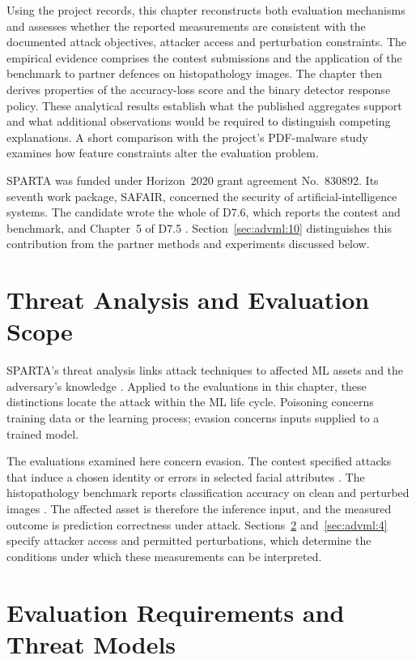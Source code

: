 Using the project records, this chapter reconstructs both evaluation mechanisms and assesses
whether the reported measurements are consistent with the documented attack objectives,
attacker access and perturbation constraints. The empirical evidence comprises the contest
submissions and the application of the benchmark to partner defences on histopathology images.
The chapter then derives properties of the accuracy-loss score and the binary detector response
policy. These analytical results establish what the published aggregates support and what
additional observations would be required to distinguish competing explanations. A short
comparison with the project's PDF-malware study examines how feature constraints alter the
evaluation problem.

SPARTA was funded under Horizon~2020 grant agreement No.~830892. Its seventh work package,
SAFAIR, concerned the security of artificial-intelligence systems. The candidate wrote the
whole of D7.6, which reports the contest and benchmark, and Chapter~5 of D7.5
\cite{sparta2022d76, sparta2021d75}. Section~\ref{sec:advml:10} distinguishes this contribution
from the partner methods and experiments discussed below.

\section{Threat Analysis and Evaluation Scope}
\label{sec:advml:2}

SPARTA's threat analysis links attack techniques to affected ML assets and the adversary's
knowledge \cite[Sections~3.3.2--3.3.6]{sparta2021d71}. Applied to the evaluations in this
chapter, these distinctions locate the attack within the ML life cycle. Poisoning concerns
training data or the learning process; evasion concerns inputs supplied to a trained model.

The evaluations examined here concern evasion. The contest specified attacks that induce a
chosen identity or errors in selected facial attributes \cite[Section~3.3]{sparta2021d73}.
The histopathology benchmark reports classification accuracy on clean and perturbed images
\cite[Section~3.1.3]{sparta2022d76}. The affected asset is therefore the inference input, and
the measured outcome is prediction correctness under attack. Sections~\ref{sec:advml:3}
and~\ref{sec:advml:4} specify attacker access and permitted perturbations, which determine
the conditions under which these measurements can be interpreted.

\section{Evaluation Requirements and Threat Models}
\label{sec:advml:3}

